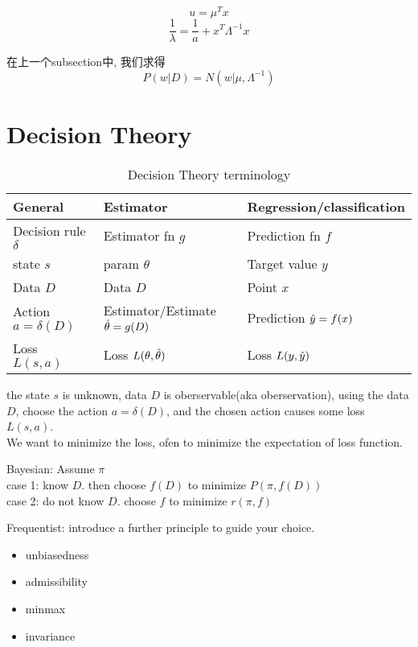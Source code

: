 \documentclass{article}
\begin{document}
$$u = \mu^T x$$
$$\dfrac{1}{\lambda} = \dfrac{1}{a} + x^T \Lambda^{-1} x$$

在上一个subsection中, 我们求得
$$P(w|D) = N(w| \mu, \Lambda^{-1})$$

\section{Decision Theory}
\begin{table}[h]
\caption{Decision Theory terminology}
\centering
\begin{tabular}{|l|l|l|}
\hline
\textbf{General}       & \textbf{Estimator}                            & \textbf{Regression/classification} \\ \hline
Decision rule $\delta$ & Estimator fn $g$                              & Prediction fn $f$                  \\ \hline
state $s$              & param $\theta$                                & Target value $y$                   \\ \hline
Data $D$               & Data $D$                                      & Point $x$                          \\ \hline
Action $a = \delta(D)$ & Estimator/Estimate $\hat{\theta} = g(D)$ & Prediction $\hat{y} = f(x)$   \\ \hline
Loss $L(s,a)$          & Loss $L(\theta, \hat{\theta})$           & Loss $L(y, \hat{y})$          \\ \hline
\end{tabular}
\end{table}

the state $s$ is unknown, data $D$ is oberservable(aka oberservation), 
using the data $D$, choose the action $a = \delta(D)$, and the chosen action causes some loss $L(s,a)$.\\
We want to minimize the loss, ofen to minimize the expectation of loss function.

Bayesian: Assume $\pi$\\
case 1: know $D$. then choose $f(D)$ to minimize $P(\pi, f(D))$\\
case 2: do not know $D$. choose $f$ to minimize $r(\pi, f)$

Frequentist: introduce a further principle to guide your choice.
\begin{itemize}
\item unbiasedness
\item admissibility
\item minmax
\item invariance
\end{itemize}
\end{document}
